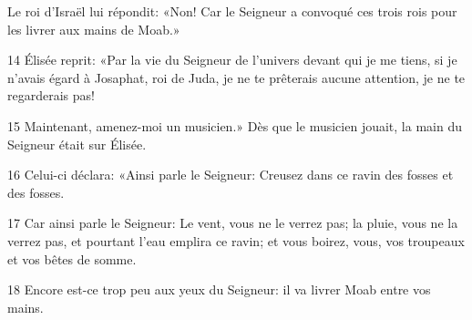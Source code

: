  Le roi d’Israël lui répondit: «Non! Car le Seigneur a convoqué ces trois rois pour les livrer aux mains de Moab.»

14 Élisée reprit: «Par la vie du Seigneur de l’univers devant qui je me tiens, si je n’avais égard à Josaphat, roi de Juda, je ne te prêterais aucune attention, je ne te regarderais pas!

15 Maintenant, amenez-moi un musicien.» Dès que le musicien jouait, la main du Seigneur était sur Élisée.

16 Celui-ci déclara: «Ainsi parle le Seigneur: Creusez dans ce ravin des fosses et des fosses.

17 Car ainsi parle le Seigneur: Le vent, vous ne le verrez pas; la pluie, vous ne la verrez pas, et pourtant l’eau emplira ce ravin; et vous boirez, vous, vos troupeaux et vos bêtes de somme.

18 Encore est-ce trop peu aux yeux du Seigneur: il va livrer Moab entre vos mains.
